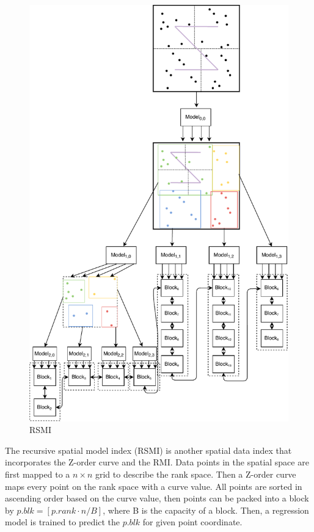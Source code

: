 \begin{figure}[ht]
\centering
\includegraphics[scale=0.7]{Figures/rsmi.pdf}
\caption{RSMI}
\label{fig:rsmi}
\end{figure}

The recursive spatial model index (RSMI) \cite{Qi:2020uz} is another spatial data index that incorporates the Z-order curve and the RMI. Data points in the spatial space are first mapped to a $n \times n$ grid to describe the rank space. Then a Z-order curve maps every point on the rank space with a curve value. All points are sorted in ascending order based on the curve value, then points can be packed into a block by $p.blk = [p.rank \cdot n/B]$, where B is the capacity of a block. Then, a regression model is trained to predict the $p.blk$ for given point coordinate. 

